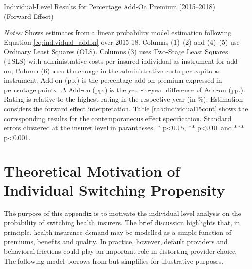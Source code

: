 \documentclass[a4paper, 11pt, english]{article}
\begin{document}
\begin{table}[ht]
	\captionsetup{justification=centering}
	\caption{Individual-Level Results for Percentage Add-On Premium (2015--2018) \\ (Forward Effect)}
	\label{tab:individual15forward}
	\begin{adjustbox}{width=\textwidth}
		
	\end{adjustbox}
	\begin{minipage}{\textwidth}
		\vspace{3pt}
		\footnotesize \textit{Notes:} Shows estimates from a linear probability model estimation following Equation \eqref{eq:individual_addon} over 2015-18. 
		Columns (1)--(2) and (4)--(5) use Ordinary Least Squares (OLS). Columns (3) uses Two-Stage Least Squares (TSLS) with administrative costs per insured individual as instrument for add-on; Column (6) uses the change in the administrative costs per capita as instrument.
		Add-on (pp.) is the percentage add-on premium expressed in percentage points. $\Delta$ Add-on (pp.) is the year-to-year difference of Add-on (pp.). Rating is relative to the highest rating in the respective year (in \%).
		Estimation considers the forward effect interpretation. Table \ref{tab:individual15cont} shows the corresponding results for the contemporaneous effect specification.
		Standard errors clustered at the insurer level in parantheses. * p<0.05, **  p<0.01 and *** p<0.001. 
	\end{minipage}
\end{table}

\clearpage
\newpage
\setcounter{figure}{0}
\setcounter{table}{0} 
\section{Theoretical Motivation of Individual Switching Propensity \label{subsec:theory}}

The purpose of this appendix is to motivate the individual level analysis on the probability of switching health insurers. The brief discussion highlights that, in principle, health insurance demand may be modelled as a simple function of premiums, benefits and quality. In practice, however, default providers and behavioral frictions could play an important role in distorting provider choice. The following model borrows from \citet{Handel2015} but simplifies for illustrative purposes. 
\end{document}
